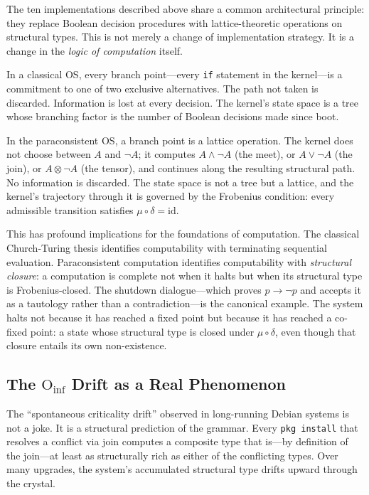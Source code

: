 \documentclass[12pt,a4paper]{article}
\begin{document}
The ten implementations described above share a common architectural
principle: they replace Boolean decision procedures with lattice-theoretic
operations on structural types. This is not merely a change of
implementation strategy. It is a change in the \emph{logic of computation}
itself.

In a classical OS, every branch point---every \texttt{if} statement in
the kernel---is a commitment to one of two exclusive alternatives. The
path not taken is discarded. Information is lost at every decision.
The kernel's state space is a tree whose branching factor is the
number of Boolean decisions made since boot.

In the paraconsistent OS, a branch point is a lattice operation. The
kernel does not choose between $A$ and $\neg A$; it computes
$A \wedge \neg A$ (the meet), or $A \vee \neg A$ (the join), or
$A \otimes \neg A$ (the tensor), and continues along the resulting
structural path. No information is discarded. The state space is not
a tree but a lattice, and the kernel's trajectory through it is
governed by the Frobenius condition: every admissible transition
satisfies $\mu \circ \delta = \mathrm{id}$.

This has profound implications for the foundations of computation.
The classical Church-Turing thesis identifies computability with
terminating sequential evaluation. Paraconsistent computation
identifies computability with \emph{structural closure}: a computation
is complete not when it halts but when its structural type is
Frobenius-closed. The shutdown dialogue---which proves $p \to \neg p$
and accepts it as a tautology rather than a contradiction---is the
canonical example. The system halts not because it has reached a fixed
point but because it has reached a co-fixed point: a state whose
structural type is closed under $\mu \circ \delta$, even though that
closure entails its own non-existence.

\subsection{The $\text{O}_{\text{inf}}$ Drift as a Real Phenomenon}

The ``spontaneous criticality drift'' observed in long-running Debian
systems is not a joke. It is a structural prediction of the grammar.
Every \texttt{pkg install} that resolves a conflict via join computes
a composite type that is---by definition of the join---at least as
structurally rich as either of the conflicting types. Over many
upgrades, the system's accumulated structural type drifts upward
through the crystal.
\end{document}
